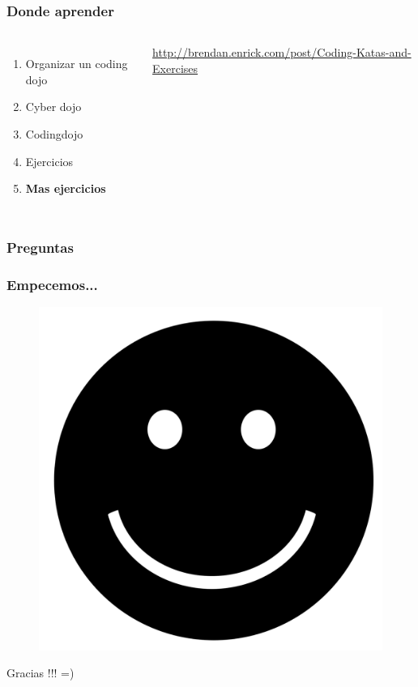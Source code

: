 \documentclass{beamer}
\begin{document}
\begin{frame}
\frametitle{Donde aprender}
\begin{columns}[c] %
\begin{enumerate}
\item Organizar un coding dojo
\item Cyber dojo
\item Codingdojo
\item Ejercicios
\item \textbf{Mas ejercicios}
\end{enumerate}

{\color{blue}\url{http://brendan.enrick.com/post/Coding-Katas-and-Exercises}}
\end{columns}
\end{frame}
\begin{frame}
\frametitle{Preguntas}
\end{frame}
\begin{frame}
\frametitle{Empecemos...}
\begin{figure}
\includegraphics[width=0.4\linewidth]{happy.png}
\end{figure}
\end{frame}
\begin{frame}
\Huge{\centerline{Gracias !!! =)}}
\end{frame}

\end{document}
